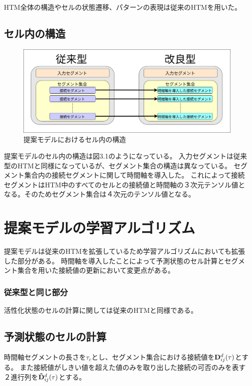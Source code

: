 HTM全体の構造やセルの状態遷移、パターンの表現は従来のHTMを用いた。

\subsection{セル内の構造}

\begin{figure}[ht]
  \begin{center}
    \includegraphics[width=14cm]{./fig/drawing_9}
    \caption{提案モデルにおけるセル内の構造}
    \label{fig:HTM_improved}
  \end{center}
\end{figure}

提案モデルのセル内の構造は図3.1のようになっている。
入力セグメントは従来型のHTMと同様になっているが、セグメント集合の構造は異なっている。
セグメント集合内の接続セグメントに関して時間軸を導入した。
これによって接続セグメントはHTM中のすべてのセルとの接続値と時間軸の３次元テンソル値となる。そのためセグメント集合は４次元のテンソル値となる。

\section{提案モデルの学習アルゴリズム}
提案モデルは従来のHTMを拡張しているため学習アルゴリズムにおいても拡張した部分がある。
時間軸を導入したことによって予測状態のセル計算とセグメント集合を用いた接続値の更新において変更点がある。

\subsubsection{従来型と同じ部分}

活性化状態のセルの計算に関しては従来のHTMと同様である。

\subsection{予測状態のセルの計算}
時間軸セグメントの長さを$\tau_c$とし、セグメント集合における接続値を${\bf D}^d_{ij}(\tau)$とする。
また接続値がしきい値を超えた値のみを取り出した接続の可否のみを表す２進行列を${\bf \tilde{D}}^d_{ij}(\tau)$とする。

